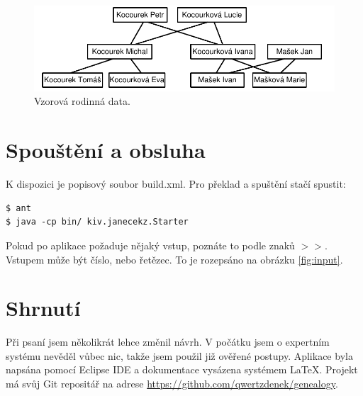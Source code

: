\documentclass[a4paper, 12pt]{article}
\begin{document}
\begin{figure}
\centering
\includegraphics[width=\textwidth]{testData}
\caption{Vzorová rodinná data.}
\label{fig:family}
\end{figure}

\section{Spouštění a obsluha}
K dispozici je popisový soubor \textsf{build.xml}. Pro překlad a spuštění
stačí spustit:
\begin{verbatim}
$ ant
$ java -cp bin/ kiv.janecekz.Starter
\end{verbatim}

Pokud po aplikace požaduje nějaký vstup, poznáte to podle
znaků $>>$. Vstupem může být číslo, nebo řetězec. To je
rozepsáno na obrázku \ref{fig:input}.

\section{Shrnutí}
Při psaní jsem několikrát lehce změnil návrh. V počátku jsem o expertním
systému nevěděl vůbec nic, takže jsem použil již ověřené postupy.
Aplikace byla napsána pomocí Eclipse IDE a dokumentace vysázena systémem
\LaTeX{}. Projekt má svůj Git repositář na adrese
\url{https://github.com/qwertzdenek/genealogy}.
\end{document}
